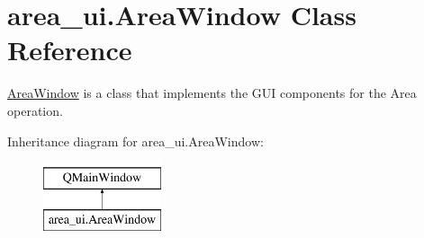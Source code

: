 \hypertarget{classarea__ui_1_1_area_window}{}\section{area\+\_\+ui.\+Area\+Window Class Reference}
\label{classarea__ui_1_1_area_window}


\hyperlink{classarea__ui_1_1_area_window}{Area\+Window} is a class that implements the G\+UI components for the Area operation.  


Inheritance diagram for area\+\_\+ui.\+Area\+Window\+:\begin{figure}[H]
\begin{center}
\leavevmode
\includegraphics[height=2.000000cm]{classarea__ui_1_1_area_window}
\end{center}
\end{figure}
